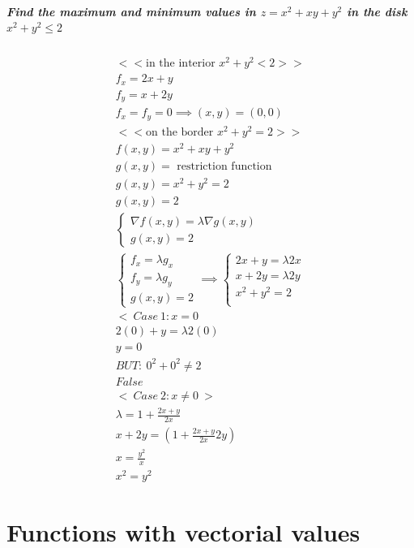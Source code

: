 \documentclass[11pt,fleqn]{book} %
\begin{document}
\paragraph*{Find the maximum and minimum values in $z=x^2+xy+y^2$ in the disk
$x^2+y^2\leq 2$}
\begin{gather}
    <<\text{in the interior } x^2 + y^2 < 2>>\\
    f_x = 2x+y\\
    f_y = x+2y\\
    f_x = f_y = 0 \implies (x,y)=(0,0)\\
    <<\text{on the border } x^2 + y^2 = 2>>\\
    f(x,y) = x^2 + xy + y^2\\
    g(x,y) = \text{ restriction function}\\
    g(x,y) = x^2 + y^2 = 2\\
    g(x,y) = 2\\
    \begin{cases}
        \nabla f(x,y) = \lambda \nabla g(x,y)\\
        g(x,y) = 2
    \end{cases}\\
    \begin{cases}
        f_x = \lambda g_x\\
        f_y = \lambda g_y\\
        g(x,y) = 2
    \end{cases} \implies \begin{cases}
        2x+y = \lambda 2x\\
        x+2y = \lambda 2y\\
        x^2+y^2=2\\
    \end{cases} \\
    < \ Case \ 1: x = 0 \>\\
    2(0)+y = \lambda 2 (0)\\
    y = 0\\
    BUT: \ 0^2+0^2 \neq 2\\
    False\\
    < \ Case \ 2: x \neq 0 \ >\\
    \lambda = 1 + \frac{2x+y}{2x}\\
    x + 2y = (1 + \frac{2x+y}{2x} 2y)\\
    x = \frac{y^2}{x}\\
    x^2 = y^2
\end{gather}

\chapter{Functions with vectorial values}
\end{document}
